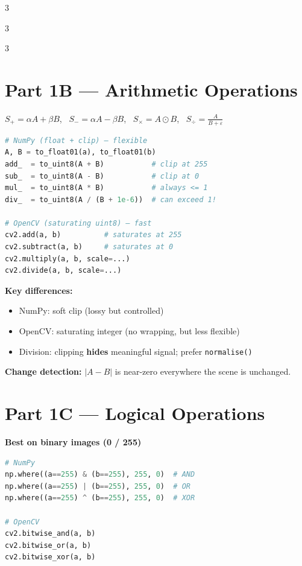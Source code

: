 \documentclass[9pt,landscape,a4paper]{extarticle}
\begin{document}
\begin{multicols*}{3}
\begin{multicols*}{3}
\begin{multicols}{3}
\section{Part 1B — Arithmetic Operations}

$S_+ = \alpha A + \beta B$, \ $S_- = \alpha A - \beta B$, \
$S_\times = A \odot B$, \ $S_\div = \frac{A}{B+\varepsilon}$

\begin{lstlisting}[language=Python]
# NumPy (float + clip) — flexible
A, B = to_float01(a), to_float01(b)
add_  = to_uint8(A + B)           # clip at 255
sub_  = to_uint8(A - B)           # clip at 0
mul_  = to_uint8(A * B)           # always <= 1
div_  = to_uint8(A / (B + 1e-6))  # can exceed 1!

# OpenCV (saturating uint8) — fast
cv2.add(a, b)          # saturates at 255
cv2.subtract(a, b)     # saturates at 0
cv2.multiply(a, b, scale=...)
cv2.divide(a, b, scale=...)
\end{lstlisting}

\textbf{Key differences:}
\begin{itemize}
  \item NumPy: soft clip (lossy but controlled)
  \item OpenCV: saturating integer (no wrapping, but less flexible)
  \item Division: clipping \textbf{hides} meaningful signal; prefer \texttt{normalise()}
\end{itemize}

\textbf{Change detection:} $|A - B|$ is near-zero everywhere the scene is unchanged.

\section{Part 1C — Logical Operations}

\textbf{Best on binary images (0 / 255)}

\begin{lstlisting}[language=Python]
# NumPy
np.where((a==255) & (b==255), 255, 0)  # AND
np.where((a==255) | (b==255), 255, 0)  # OR
np.where((a==255) ^ (b==255), 255, 0)  # XOR

# OpenCV
cv2.bitwise_and(a, b)
cv2.bitwise_or(a, b)
cv2.bitwise_xor(a, b)
\end{lstlisting}


\end{multicols}
\end{multicols*}
\end{multicols*}
\end{document}
